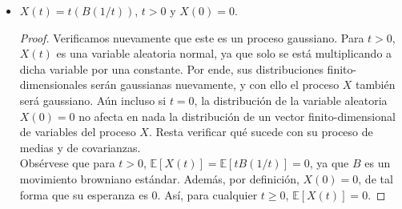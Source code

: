 \documentclass[letterpaper]{article}
\newcommand{\E}{\mathbb{E}}
\newcommand{\1}{\mathds{1}}
\theoremstyle{definition}
\theoremstyle{definition}
\theoremstyle{definition}
\theoremstyle{definition}
\theoremstyle{definition}
\begin{document}
\begin{enumerate}
\begin{itemize}
\begin{proof}
          Notamos que $\E\left[X(t)\right]=\E\left[cB(t/c^2)\right]=0,$ para $0<\leq t \leq T$, ya que $B$ es un
          movimiento browniano estándar. Resta ver la función de covarianzas:
          \begin{align*}
            \Gamma_X(s,t)&=\text{Cov}\left(cB(s/c^2),cB(t/c^2)\right)\\
            &=c^2\left((s/c^2)\wedge (t/c^2)\right),\\
          \end{align*}
          y dado que $c^2>0$, entonces 
          \[
          \Gamma_X(s,t)=c^2\left((s/c^2)\wedge (t/c^2)\right)=(c^2/c^2)s\wedge t=s\wedge t,  
          \]
          para $0\leq s,t\leq T$. Obsérvese que en la prueba anterior no se usa en ningún momento
          que $T$ sea finito o infinito salvo por el intervalo en donde se eligen $s$ y $t$. 
          Concluimos que $X$ en efecto es un movimiento browniano estándar.
         \end{proof}
        \item $X(t)=t(B(1/t))$, $t>0$ y $X(0)=0$.
        \begin{proof} 
          Verificamos nuevamente que este es un proceso gaussiano. Para $t>0$, $X(t)$ es una
          variable aleatoria normal, ya que solo se está multiplicando a dicha variable por
          una constante. Por ende, sus distribuciones finito-dimensionales serán gaussianas
          nuevamente, y con ello el proceso $X$ también será gaussiano. Aún incluso si $t=0$,
          la distribución de la variable aleatoria $X(0)=0$ no afecta en nada la distribución
          de un vector finito-dimensional de variables del proceso $X$. Resta verificar qué sucede con su proceso de medias y de covarianzas.\\

          Obsérvese que para $t>0$, $\E\left[X(t)\right]=\E\left[tB(1/t)\right]=0$, ya que
          $B$ es un movimiento browniano estándar. Además, por definición, $X(0)=0$, de tal
          forma que su esperanza es 0. Así, para cualquier $t\geq0$, $\E\left[X(t)\right]=0$.
          \newline


\end{proof}
\end{itemize}
\end{enumerate}
\end{document}
